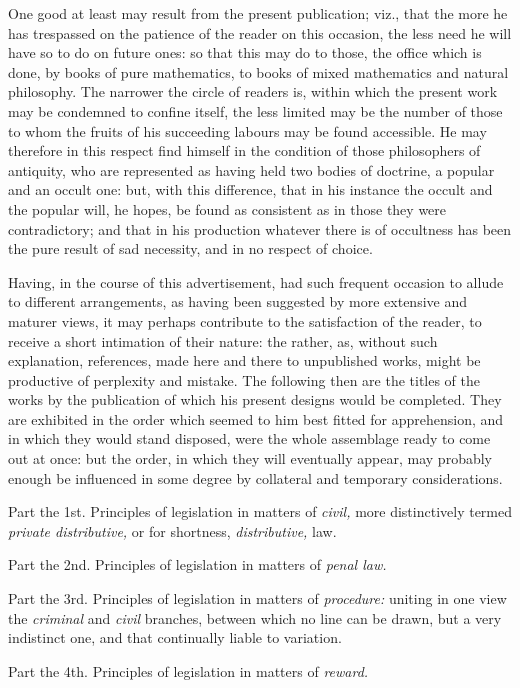 \documentclass[12pt]{report}
\begin{document}
One good at least may result from the present publication; viz., that
the more he has trespassed on the patience of the reader on this
occasion, the less need he will have so to do on future ones: so that
this may do to those, the office which is done, by books of pure
mathematics, to books of mixed mathematics and natural philosophy. The
narrower the circle of readers is, within which the present work may be
condemned to confine itself, the less limited may be the number of those
to whom the fruits of his succeeding labours may be found accessible. He
may therefore in this respect find himself in the condition of those
philosophers of antiquity, who are represented as having held two bodies
of doctrine, a popular and an occult one: but, with this difference,
that in his instance the occult and the popular will, he hopes, be found
as consistent as in those they were contradictory; and that in his
production whatever there is of occultness has been the pure result of
sad necessity, and in no respect of choice.

Having, in the course of this advertisement, had such frequent occasion
to allude to different arrangements, as having been suggested by more
extensive and maturer views, it may perhaps contribute to the
satisfaction of the reader, to receive a short intimation of their
nature: the rather, as, without such explanation, references, made here
and there to unpublished works, might be productive of perplexity and
mistake. The following then are the titles of the works by the
publication of which his present designs would be completed. They are
exhibited in the order which seemed to him best fitted for apprehension,
and in which they would stand disposed, were the whole assemblage ready
to come out at once: but the order, in which they will eventually
appear, may probably enough be influenced in some degree by collateral
and temporary considerations.

Part the 1st. Principles of legislation in matters of \emph{civil,} more
distinctively termed \emph{private distributive,} or for shortness,
\emph{distributive,} law.

Part the 2nd. Principles of legislation in matters of \emph{penal law.}
\emph{}

Part the 3rd. Principles of legislation in matters of \emph{procedure:}
uniting in one view the \emph{criminal} and \emph{civil} branches,
between which no line can be drawn, but a very indistinct one, and that
continually liable to variation.

Part the 4th. Principles of legislation in matters of \emph{reward.}
\end{document}
